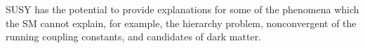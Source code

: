 \documentclass[12pt]{report}
\begin{document}
SUSY has the potential to provide explanations for some of the phenomena which the SM cannot explain, for example, the hierarchy problem, nonconvergent of the running coupling constants, and candidates of dark matter.
\end{document}
